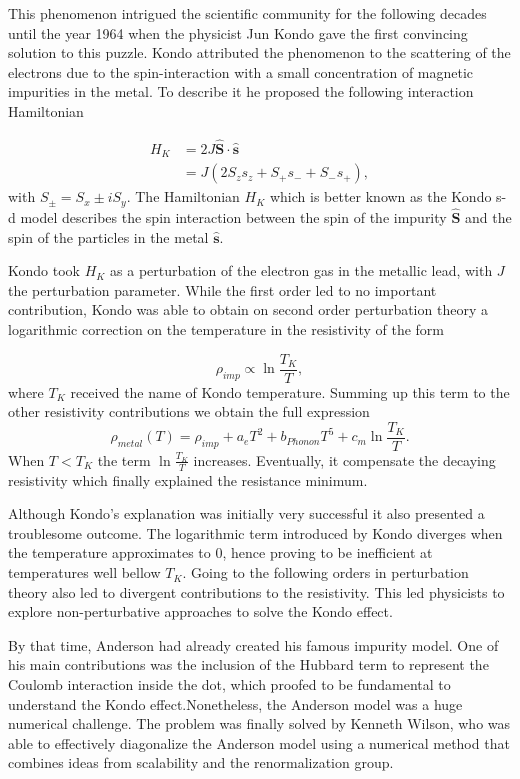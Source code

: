This phenomenon intrigued the scientific community for the following decades until the year 1964 when the physicist  Jun Kondo gave the first convincing solution to this puzzle. Kondo attributed the phenomenon to the scattering of the electrons due to the spin-interaction with a small concentration of magnetic impurities in the metal. To describe it he proposed the following interaction Hamiltonian

\begin{align}
H_K &= 2J\hat{\textbf{S}}\cdot \hat{\textbf{s}} \\
&=  J (2S_z s_z + S_+s_- +S_-s_+),
\end{align}
with $S_\pm = S_x \pm iS_y$. The Hamiltonian $H_K$ which is better known as the Kondo s-d model describes the spin interaction between the spin of the impurity $\hat{\textbf{S}}$ and the spin of the particles in the metal $\hat{\textbf{s}}$.

Kondo took $H_K$ as a perturbation of the electron gas in the metallic lead, with $J$ the perturbation parameter. While the first order led to no important contribution, Kondo was able to obtain on second order perturbation theory a logarithmic correction on the temperature in the resistivity of the form 

\begin{equation}
\rho_{imp} \propto \ln{\frac {
T_K }{T}},
\end{equation}
where $T_K$ received the name of Kondo temperature. Summing up this term to the other resistivity contributions we obtain the full expression 
\begin{equation}
{\displaystyle \rho_{metal} (T)=\rho_{imp}+a_{e}T^{2}+b_{Phonon}T^{5} + c_{m}\ln {\frac {
T_K }{T}}}.
\label{logKondo}
\end{equation}
\noindent When $T< T_K$ the term $ \ln {\frac {
T_K }{T}}$ increases. Eventually, it compensate the decaying resistivity which finally explained the  resistance minimum. 

Although Kondo's explanation was initially very successful it also presented a troublesome outcome. The logarithmic term introduced by Kondo diverges when the temperature approximates to $0$, hence proving to be inefficient at temperatures well bellow $T_K$. Going to the following orders in perturbation theory also led to divergent contributions to the  resistivity. This led physicists  to explore non-perturbative approaches to solve the Kondo effect. 

By that time, Anderson had already created his famous impurity model. One of his main contributions was the inclusion of the Hubbard term to represent the Coulomb interaction inside the dot, which proofed to be fundamental to understand the Kondo effect.Nonetheless, the Anderson model was a huge numerical challenge. The problem was finally solved by Kenneth Wilson, who was able to effectively diagonalize the Anderson model using a numerical method that combines ideas from scalability and the renormalization group. 


